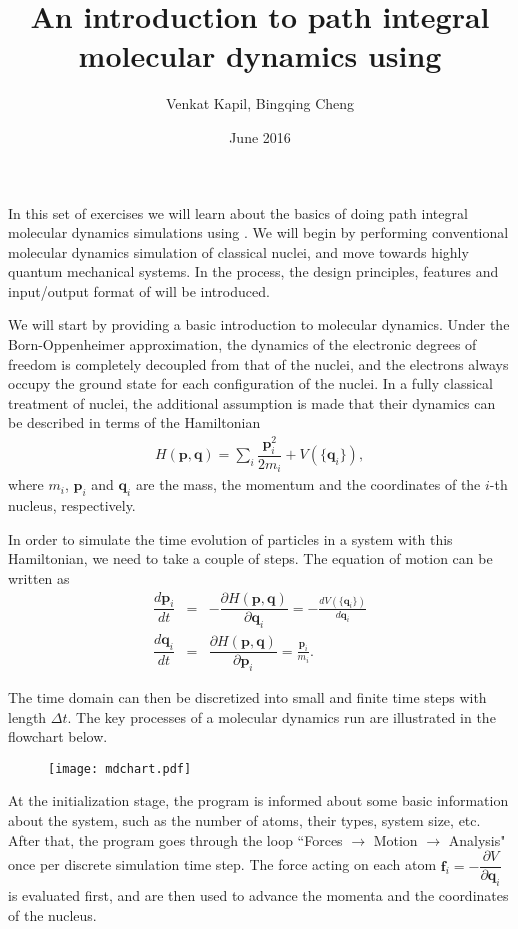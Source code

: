 \documentclass{article}
\title{An introduction to path integral \\molecular dynamics using \ipi{}}
\author{Venkat Kapil, Bingqing Cheng}
\date{June 2016}
\begin{document}
\maketitle

In this set of exercises we will learn 
about the basics of doing path integral 
molecular dynamics simulations using \ipi{}. 
We will begin by performing conventional
molecular dynamics simulation of classical nuclei,
and move towards highly quantum mechanical systems.
In the process, the design principles, 
features and input/output format of \ipi{} 
will be introduced.

\begin{Exercise}[label={i-pi},title={Molecular Dynamics: a client/server approach}]

We will start by providing a basic introduction to molecular dynamics.
Under the Born-Oppenheimer
approximation, the dynamics of the electronic
degrees of freedom is completely decoupled from that of the nuclei, and the electrons always
occupy the ground state for each configuration of the nuclei. 
In a fully classical treatment of nuclei, the
additional assumption is made that their 
dynamics can be described in terms of the 
Hamiltonian
\begin{eqnarray}
    H(\textbf{p},\textbf{q})=\sum_i \dfrac{\textbf{p}_i^2}{2 m_i} + V(\{\textbf{q}_i\}),
\end{eqnarray}
where $m_i$, $\textbf{p}_i$ and $\textbf{q}_i$ 
are the mass, the momentum and the coordinates of the $i$-th nucleus, respectively.

In order to simulate the time evolution of particles in a system
with this Hamiltonian, we need to take a couple of steps.
The equation of motion can be written as
\begin{eqnarray}
   \dfrac{d \textbf{p}_i}{d t}&=& 
   - \dfrac{\partial H(\textbf{p},\textbf{q})}{\partial \textbf{q}_i}=-\frac{d V(\{\textbf{q}_i\})}{d\textbf{q}_i} \\
   \dfrac{d \textbf{q}_i}{d t}&=& 
   \dfrac{\partial H(\textbf{p},\textbf{q})}{\partial \textbf{p}_i} = \frac{\textbf{p}_i}{m_i}.
\end{eqnarray}

The time domain can then be discretized into small  and finite time steps with length $\Delta t$.
The key processes of a molecular dynamics run are illustrated in the flowchart below.
\begin{figure}[h]
    \begin{center}
    \texttt{[image: mdchart.pdf]}
    \end{center}
\end{figure}
At the initialization stage, the program is informed about some basic information about the system,
such as the number of atoms, their types, system size, etc.
After that, the program goes through the loop ``Forces $\rightarrow$ Motion $\rightarrow$ Analysis" once per discrete simulation time step.
The force acting on each atom $\textbf{f}_i=-\dfrac{\partial V}{\partial \textbf{q}_i}$ is evaluated first,
and are then used to advance the momenta and the coordinates of the nucleus. 


\end{Exercise}
\end{document}
